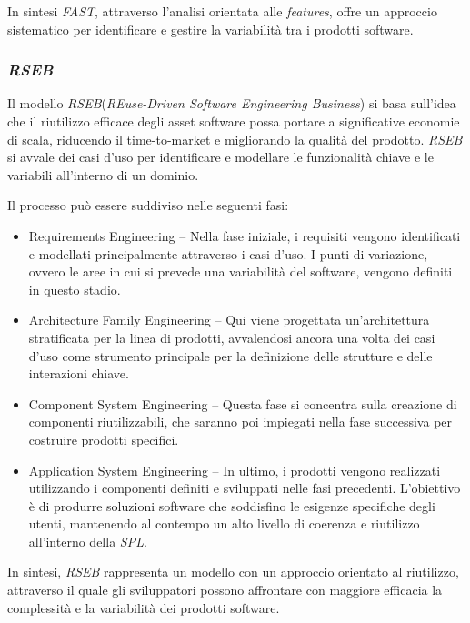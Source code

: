\documentclass[12pt]{report}
\newcommand{\spl}{\textsl{SPL}\xspace}
\newcommand{\fast}{\textsl{FAST}\xspace}
\newcommand{\rseb}{\textsl{RSEB}\xspace}
\begin{document}
In sintesi \fast, attraverso l'analisi orientata alle \textit{features}, offre un approccio sistematico per identificare e gestire la variabilità tra i prodotti software.


\subsubsection{\rseb}
Il modello \rseb (\textit{REuse-Driven Software Engineering Business}) \cite{griss:favaro:alessandro} si basa sull'idea che il riutilizzo efficace degli asset software possa portare a significative economie di scala, riducendo il time-to-market e migliorando la qualità del prodotto. \rseb si avvale dei casi d'uso per identificare e modellare le funzionalità chiave e le variabili all'interno di un dominio.

Il processo può essere suddiviso nelle seguenti fasi:

\begin{itemize}
\item \textsf{Requirements Engineering} -- Nella fase iniziale, i requisiti vengono identificati e modellati principalmente attraverso i casi d'uso. I punti di variazione, ovvero le aree in cui si prevede una variabilità del software, vengono definiti in questo stadio.
\item \textsf{Architecture Family Engineering} -- Qui viene progettata un'architettura stratificata per la linea di prodotti, avvalendosi ancora una volta dei casi d'uso come strumento principale per la definizione delle strutture e delle interazioni chiave.
\item \textsf{Component System Engineering} -- Questa fase si concentra sulla creazione di componenti riutilizzabili, che saranno poi impiegati nella fase successiva per costruire prodotti specifici.
\item \textsf{Application System Engineering} -- In ultimo, i prodotti vengono realizzati utilizzando i componenti definiti e sviluppati nelle fasi precedenti. L'obiettivo è di produrre soluzioni software che soddisfino le esigenze specifiche degli utenti, mantenendo al contempo un alto livello di coerenza e riutilizzo all'interno della \spl.
\end{itemize}

In sintesi, \rseb rappresenta un modello con un approccio orientato al riutilizzo, attraverso il quale gli sviluppatori possono affrontare con maggiore efficacia la complessità e la variabilità dei prodotti software.
\end{document}
